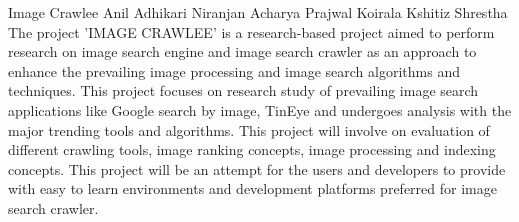  \begin{conf-abstract}[]
 {Image Crawlee}
{
Anil Adhikari
Niranjan Acharya
Prajwal Koirala
Kshitiz Shrestha
}
{}
The project 'IMAGE CRAWLEE' is a research-based project aimed to perform research on image search 
engine and image search crawler as an approach to enhance the prevailing image processing and image 
search algorithms and techniques. This project focuses on research study of prevailing image search 
applications like Google search by image, TinEye and undergoes analysis with the major trending tools 
and algorithms. This project will involve on evaluation of different crawling tools, image ranking concepts,
image processing and indexing concepts. This project will be an attempt for the users and developers to 
provide with easy to learn environments and development platforms preferred for image search crawler.
  \end{conf-abstract}